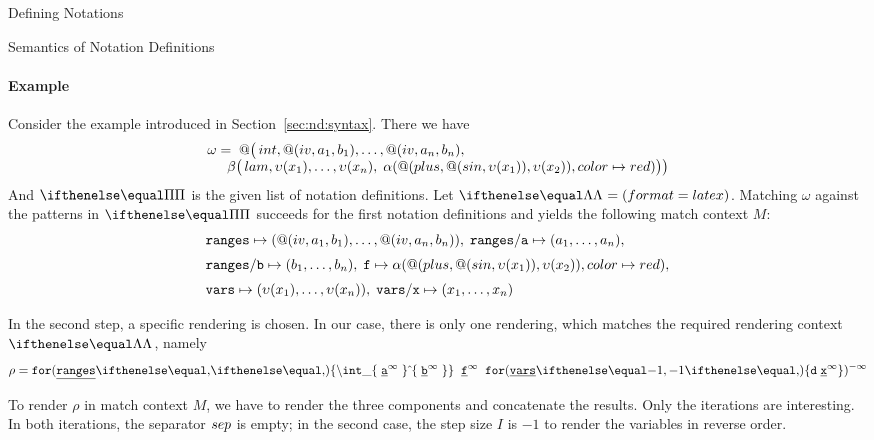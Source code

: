 \begin{omgroup}[creators=miko,short={Notation and Presentation},id=pres]
\begin{omgroup}[creators={miko,frabe},id=sec:ntn-definition]{Defining Notations}
\begin{omgroup}[id=sec:nd:semantics]{Semantics of Notation Definitions}
\paragraph{Example}
Consider the example introduced in Section~\ref{sec:nd:syntax}. There we have
\[\begin{array}{l} \omega = \;
   @\big(\mathop{int},@(\mathop{iv},a_1,b_1),\ldots,@(\mathop{iv},a_n,b_n),\\
   \hspace*{.5cm} \beta\big(\mathop{lam},\upsilon(x_1),\ldots,\upsilon(x_n), \; \alpha(@(plus,@(\mathop{sin},\upsilon(x_1)),\upsilon(x_2)),\mathop{color}\mapsto\mathop{red})\big)\big)
\end{array}\]
And $\NC{}$ is the given list of notation definitions. Let $\RC{}{}=(format=latex)$. Matching $\omega$ against the patterns in $\NC{}$ succeeds for the first notation definitions and yields the following match context $M$:
\[\begin{array}{l}{\mathtt{ranges}}\mapsto (@(\mathop{iv},a_1,b_1),\ldots,@(\mathop{iv},a_n,b_n)),\;{\mathtt{ranges}}/{\mathtt{a}}\mapsto (a_1,\ldots,a_n),\\[.2cm]{\mathtt{ranges}}/{\mathtt{b}}\mapsto (b_1,\ldots,b_n),\;
{\mathtt{f}}\mapsto \alpha(@(plus,@(\mathop{sin},\upsilon(x_1)),\upsilon(x_2)),\mathop{color}\mapsto\mathop{red}),\\[.2cm] {\mathtt{vars}}\mapsto (\upsilon(x_1),\ldots,\upsilon(x_n)),\; {\mathtt{vars}}/{\mathtt{x}}\mapsto (x_1,\ldots,x_n)\end{array}\]

In the second step, a specific rendering is chosen. In our case, there is only one rendering, which matches the required rendering context $\RC{}{}$, namely
\[\rho = \PIIterate[]
    {\mathtt{ranges}}
    {}
    {\PIText{\mathtt{\backslash int\_\{}\;\PIRecurse{\mathtt{a}}{\infty}\;\PIText{\}\caret\{}\;\PIRecurse{\mathtt{b}}{\infty}\;\PIText{\}}}}\;\;
  \PIRecurse{\mathtt{f}}{\infty}\;\;
  \PIIterate[-1]
    {\mathtt{vars}}
    {}
    {\PIText{\mathtt{d}}\;\PIRecurse{\mathtt{x}}{\infty}}
)^{-\infty}
\]

To render $\rho$ in match context $M$, we have to render the three components and
concatenate the results. Only the iterations are interesting. In both iterations, the
separator $\mathop{sep}$ is empty; in the second case, the step size $I$ is $-1$ to render the
variables in reverse order.
\end{omgroup}
\end{omgroup}
\end{omgroup}

